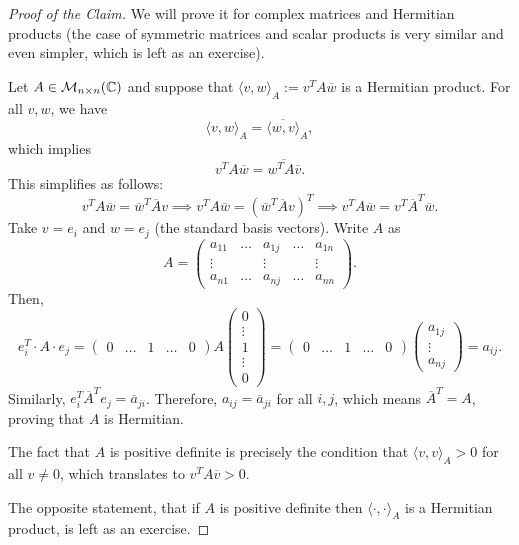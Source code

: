 \begin{proof}[Proof of the Claim]
    We will prove it for complex matrices and Hermitian products (the case of symmetric matrices and scalar products is very similar and even simpler, which is left as an exercise). 
    
    Let $A \in \mathcal{M}_{n \times n}(\mathbb{C})$ and suppose that $\langle v, w \rangle_A := v^T A \overline{w}$ is a Hermitian product. For all $v, w$, we have 
    \begin{equation}\langle v, w \rangle_A = \overline{\langle w, v \rangle}_A,\end{equation} 
    which implies
    \begin{equation*}
        v^T A \overline{w} = \overline{w^T A \overline{v}}.
    \end{equation*}
    This simplifies as follows:
    \begin{equation*}
        v^T A \overline{w} = \overline{w}^T \overline{A} v \implies v^T A \overline{w} = (\overline{w}^T \overline{A} v)^T \implies v^T A \overline{w} = v^T \overline{A}^T \overline{w}.
    \end{equation*}
    Take $v = e_i$ and $w = e_j$ (the standard basis vectors). Write $A$ as
    \begin{equation*}
        A = \begin{pmatrix} a_{11} & \dots & a_{1j} & \dots & a_{1n} \\ \vdots & & \vdots & & \vdots \\ a_{n1} & \dots & a_{nj} & \dots & a_{nn} \end{pmatrix}.
    \end{equation*}
    Then,
    \begin{equation*}
        e_i^T \cdot A \cdot e_j = \begin{pmatrix} 0 & \dots & 1 & \dots & 0 \end{pmatrix} A \begin{pmatrix} 0 \\ \vdots \\ 1 \\ \vdots \\ 0 \end{pmatrix} = \begin{pmatrix} 0 & \dots & 1 & \dots & 0 \end{pmatrix} \begin{pmatrix} a_{1j} \\ \vdots \\ a_{nj} \end{pmatrix} = a_{ij}.
    \end{equation*}
    Similarly, $e_i^T \overline{A}^T e_j = \overline{a}_{ji}$. Therefore, $a_{ij} = \overline{a}_{ji}$ for all $i, j$, which means $\overline{A}^T = A$, proving that $A$ is Hermitian. 
    
    The fact that $A$ is positive definite is precisely the condition that $\langle v, v \rangle_A > 0$ for all $v \neq 0$, which translates to $v^T A \overline{v} > 0$.
    
    The opposite statement, that if $A$ is positive definite then $\langle \cdot, \cdot \rangle_A$ is a Hermitian product, is left as an exercise.
\end{proof}

